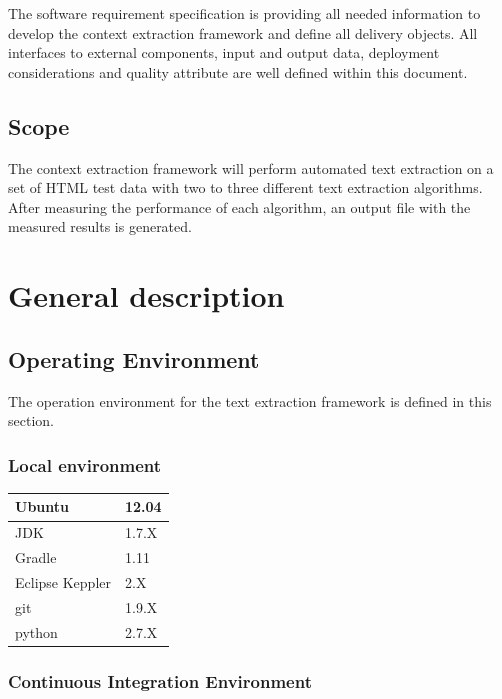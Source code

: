 The software requirement specification is providing all needed information to develop the context extraction framework and define all delivery objects. All interfaces to external components, input and output data, deployment considerations and quality attribute are well defined within this document.


\subsection{Scope}


The context extraction framework will perform automated text extraction on a set of HTML test data with two to three different text extraction algorithms. After measuring the performance of each algorithm, an output file with the measured results is generated.


\section{General description}

\subsection{Operating Environment}

The operation environment for the text extraction framework is defined in this section.

\subsubsection{Local environment}

\begin{tabular}{| p{3cm} | p{3cm} |}
	\hline
	Ubuntu & 12.04 \\ \hline
	JDK & 1.7.X  \\ \hline
	Gradle & 1.11 \\ \hline
	Eclipse Keppler & 2.X \\ \hline
	git & 1.9.X \\ \hline
	python & 2.7.X \\ \hline

\end{tabular}


\subsubsection{Continuous Integration Environment}

